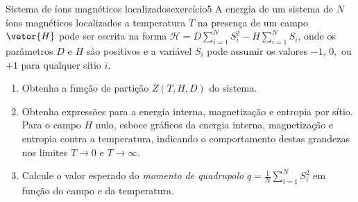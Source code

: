 \begin{exercício}{Sistema de íons magnéticos localizados}{exercício5}
    A energia de um sistema de \(N\) íons magnéticos localizados a temperatura \(T\) na presença de um campo \(\vetor{H}\) pode ser escrita na forma \(\mathcal{H} = D \sum_{i = 1}^N S_i^2 - H \sum_{i = 1}^N S_i\), onde os parâmetros \(D\) e \(H\) são positivos e a variável \(S_i\) pode assumir os valores \(-1\), \(0,\) ou \(+1\) para qualquer sítio \(i\).
    \begin{enumerate}[label=(\alph*)]
        \item Obtenha a função de partição \(Z(T, H, D)\) do sistema.
        \item Obtenha expressões para a energia interna, magnetização e entropia por sítio. Para o campo \(H\) nulo, esboce gráficos da energia interna, magnetização e entropia contra a temperatura, indicando o comportamento destas grandezas nos limites \(T \to 0\) e \(T \to \infty\).

        \item Calcule o valor esperado do \emph{momento de quadrupolo} \(q = \frac{1}{N} \sum_{i=1}^N{S_i^2}\) em função do campo e da temperatura.
    \end{enumerate}
\end{exercício}
